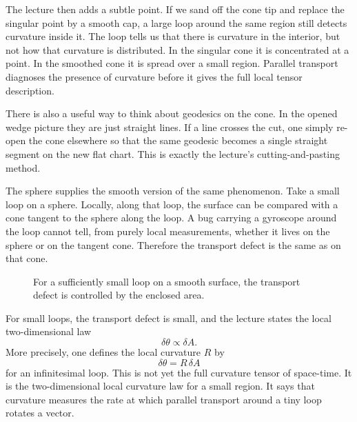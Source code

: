 The lecture then adds a subtle point. If we sand off the cone tip and replace the singular point by a smooth cap, a large loop around the same region still detects curvature inside it. The loop tells us that there is curvature in the interior, but not how that curvature is distributed. In the singular cone it is concentrated at a point. In the smoothed cone it is spread over a small region. Parallel transport diagnoses the presence of curvature before it gives the full local tensor description.

There is also a useful way to think about geodesics on the cone. In the opened wedge picture they are just straight lines. If a line crosses the cut, one simply re-open the cone elsewhere so that the same geodesic becomes a single straight segment on the new flat chart. This is exactly the lecture's cutting-and-pasting method.

The sphere supplies the smooth version of the same phenomenon. Take a small loop on a sphere. Locally, along that loop, the surface can be compared with a cone tangent to the sphere along the loop. A bug carrying a gyroscope around the loop cannot tell, from purely local measurements, whether it lives on the sphere or on the tangent cone. Therefore the transport defect is the same as on that cone.

\begin{figure}[h]
\centering
{}
\caption{For a sufficiently small loop on a smooth surface, the transport defect is controlled by the enclosed area.}
\end{figure}

For small loops, the transport defect is small, and the lecture states the local two-dimensional law
\begin{equation}
\delta\theta \propto \delta A.
\end{equation}
More precisely, one defines the local curvature \(R\) by
\begin{equation}
\delta\theta = R\,\delta A
\end{equation}
for an infinitesimal loop. This is not yet the full curvature tensor of space-time. It is the two-dimensional local curvature law for a small region. It says that curvature measures the rate at which parallel transport around a tiny loop rotates a vector.

